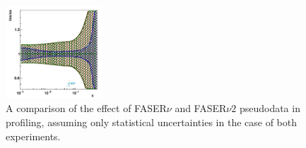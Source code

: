\begin{figure}[t]
\includegraphics[width=0.32\textwidth]{plots/proton_fasernu2/FASERv2_vs_FASERv/statOnly_FASERv_q2_10000_pdf_s_ratio.pdf}
\caption{
A comparison of the effect of FASER$\nu$ and FASER$\nu2$ pseudodata in profiling, 
assuming only statistical uncertainties in the case of both experiments.
}
\label{fig:profiling_FASERv2_vs_FASERv}
\end{figure}

